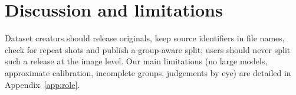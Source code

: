 \section{Discussion and limitations}
\label{sec:discussion}

Dataset creators should release originals, keep source identifiers in file names, check for repeat shots and publish a group-aware split; users should never split such a release at the image level. Our main limitations (no large models, approximate calibration, incomplete groups, judgements by eye) are detailed in Appendix~\ref{app:role}.

